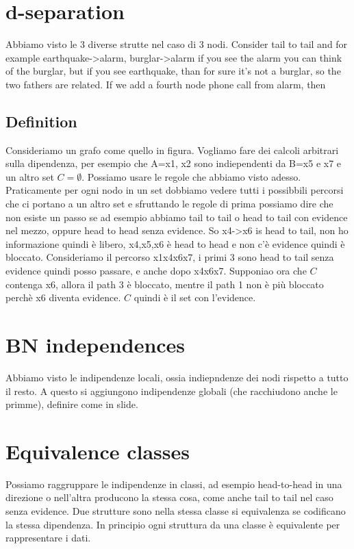 \section{d-separation}
Abbiamo visto le 3 diverse strutte nel caso di 3 nodi. Consider tail to tail and for example earthquake->alarm, burglar->alarm if you see the alarm you can think of the burglar, but if you see earthquake, than for sure it's not a burglar, so the two fathers are related. \newline
If we add a fourth node phone call from alarm, then
\subsection{Definition}
Consideriamo un grafo come quello in figura. Vogliamo fare dei calcoli arbitrari sulla dipendenza, per esempio che A=x1, x2 sono indiependenti da B=x5 e x7 e un altro set $C=\emptyset$. Possiamo usare le regole che abbiamo visto adesso. Praticamente per ogni nodo in un set dobbiamo vedere tutti i possibbili percorsi che ci portano a un altro set e sfruttando le regole di prima possiamo dire che non esiste un passo se ad esempio abbiamo tail to tail o head to tail con evidence nel mezzo, oppure head to head senza evidence. So x4->x6 is head to tail, non ho informazione quindi è libero, x4,x5,x6 è head to head e non c'è evidence quindi è bloccato. Consideriamo il percorso x1x4x6x7, i primi 3 sono head to tail senza evidence quindi posso passare, e anche dopo x4x6x7. \newline
Supponiao ora che $C$ contenga x6, allora il path 3 è bloccato, mentre il path 1 non è più bloccato perchè x6 diventa evidence.\newline
$C$ quindi è il set con l'evidence. 
\section{BN independences}
Abbiamo visto le indipendenze locali, ossia indiepndenze dei nodi rispetto a tutto il resto. A questo si aggiungono indipendenze globali (che racchiudono anche le primme), definire come in slide. \newline
\section{Equivalence classes}
Possiamo raggruppare le indipendenze in classi, ad esempio head-to-head in una direzione o nell'altra producono la stessa cosa, come anche tail to tail nel caso senza evidence. Due strutture sono nella stessa classe si equivalenza se codificano la stessa dipendenza. In principio ogni struttura da una classe è equivalente per rappresentare i dati. \newline
